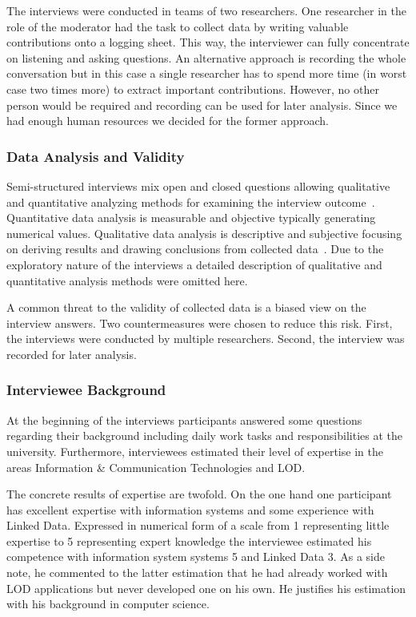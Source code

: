 \documentclass{article}
\begin{document}
The interviews were conducted in teams of two researchers. One researcher in the role of the moderator had the task to collect data by writing valuable contributions onto a logging sheet. This way, the interviewer can fully concentrate on listening and asking questions. An alternative approach is recording the whole conversation but in this case a single researcher has to spend more time (in worst case two times more) to extract important contributions. However, no other person would be required and recording can be used for later analysis.
Since we had enough human resources we decided for the former approach. 

\subsubsection{Data Analysis and Validity}
Semi-structured interviews mix open and closed questions allowing qualitative and quantitative analyzing methods for examining the interview outcome~\cite{article:runeson2009-interview-guidelines}. Quantitative data analysis is measurable and objective typically generating numerical values. Qualitative data analysis is descriptive and subjective focusing on deriving results and drawing conclusions from collected data~\cite{article:yin2003case-case-study-research-and-design}. Due to the exploratory nature of the interviews a detailed description of qualitative and quantitative analysis methods were omitted here.  

A common threat to the validity of collected data is a biased view on the interview answers. Two countermeasures were chosen to reduce this risk. First, the interviews were conducted by multiple researchers. Second, the interview was recorded for later analysis. 

\subsubsection{Interviewee Background}
At the beginning of the interviews participants answered some questions regarding their background including daily work tasks and responsibilities at the university. Furthermore, interviewees estimated their level of expertise in the areas Information \& Communication Technologies and LOD.

The concrete results of expertise are twofold. 
On the one hand one participant has excellent expertise with information systems and some experience with Linked Data. Expressed in numerical form of a scale from 1 representing little expertise to 5 representing expert knowledge the interviewee estimated his competence with information system systems 5 and Linked Data 3. As a side note, he commented to the latter estimation that he had already worked with LOD applications but never developed one on his own. He justifies his estimation with his background in computer science. 
\end{document}
